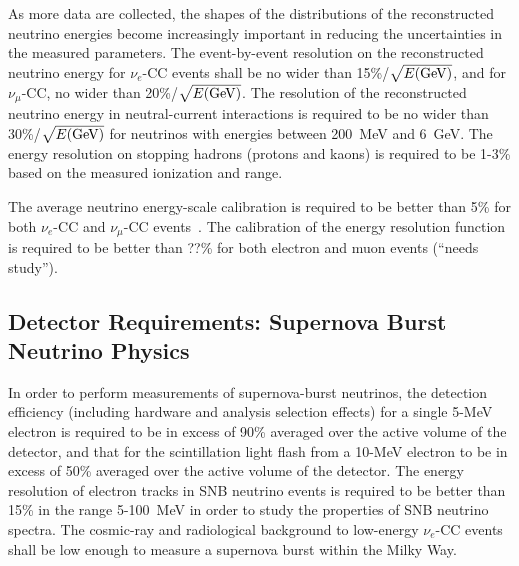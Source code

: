 As more data are collected, the shapes of the distributions of the
reconstructed neutrino energies become increasingly important in
reducing the uncertainties in the measured parameters.  The event-by-event resolution on the reconstructed neutrino
energy for $\nu_e$-CC events %
shall be no wider than 15\%/$\sqrt{E({\rm GeV})}$,
 and for $\nu_\mu$-CC, no wider than 20\%/$\sqrt{E({\rm GeV})}$.  
The resolution of the reconstructed neutrino energy in
neutral-current interactions is required to be no wider than
30\%/$\sqrt{E({\rm GeV})}$ for neutrinos with energies between 200~MeV
and 6~GeV.  The energy resolution on stopping hadrons (protons and kaons) is required
to be 1-3\% based on the measured ionization and range.

The average neutrino energy-scale calibration is required
to be better than 5\% for both $\nu_e$-CC and $\nu_\mu$-CC
events~\cite{docdb8741}.  %
The calibration of the energy resolution function is required to be better than ??\%
for both electron and muon events (``needs study'').

\subsection{Detector Requirements: Supernova Burst Neutrino Physics}

In order to perform measurements of supernova-burst neutrinos, %
the detection efficiency (including hardware and analysis
selection effects) for a single 5-MeV electron is required to be in excess of 90\%
averaged over the active volume of the detector, and that %
for the scintillation light flash from a 10-MeV
electron to be in excess of 50\% averaged over the active volume of the
detector.  The energy resolution of electron tracks in SNB neutrino
events is required to be better than 15\% in the range 5-100~MeV in
order to study the properties of SNB neutrino spectra.  The cosmic-ray
and radiological background to low-energy $\nu_e$-CC events shall be low enough to measure
a supernova burst within the Milky Way.


